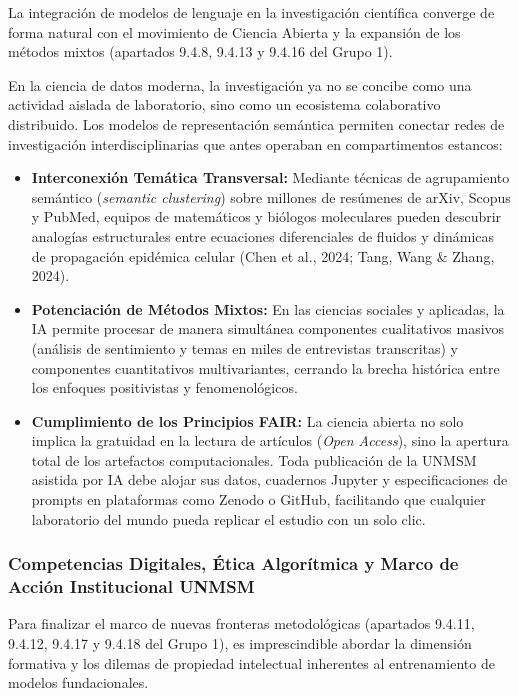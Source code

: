 La integración de modelos de lenguaje en la investigación científica converge de forma natural con el movimiento de Ciencia Abierta y la expansión de los métodos mixtos (apartados 9.4.8, 9.4.13 y 9.4.16 del Grupo 1).

En la ciencia de datos moderna, la investigación ya no se concibe como una actividad aislada de laboratorio, sino como un ecosistema colaborativo distribuido. Los modelos de representación semántica permiten conectar redes de investigación interdisciplinarias que antes operaban en compartimentos estancos:
\begin{itemize}
    \item \textbf{Interconexión Temática Transversal:} Mediante técnicas de agrupamiento semántico (\textit{semantic clustering}) sobre millones de resúmenes de arXiv, Scopus y PubMed, equipos de matemáticos y biólogos moleculares pueden descubrir analogías estructurales entre ecuaciones diferenciales de fluidos y dinámicas de propagación epidémica celular (Chen et al., 2024; Tang, Wang \& Zhang, 2024).
    \item \textbf{Potenciación de Métodos Mixtos:} En las ciencias sociales y aplicadas, la IA permite procesar de manera simultánea componentes cualitativos masivos (análisis de sentimiento y temas en miles de entrevistas transcritas) y componentes cuantitativos multivariantes, cerrando la brecha histórica entre los enfoques positivistas y fenomenológicos.
    \item \textbf{Cumplimiento de los Principios FAIR:} La ciencia abierta no solo implica la gratuidad en la lectura de artículos (\textit{Open Access}), sino la apertura total de los artefactos computacionales. Toda publicación de la UNMSM asistida por IA debe alojar sus datos, cuadernos Jupyter y especificaciones de prompts en plataformas como Zenodo o GitHub, facilitando que cualquier laboratorio del mundo pueda replicar el estudio con un solo clic.
\end{itemize}

\subsubsection{Competencias Digitales, Ética Algorítmica y Marco de Acción Institucional UNMSM}

Para finalizar el marco de nuevas fronteras metodológicas (apartados 9.4.11, 9.4.12, 9.4.17 y 9.4.18 del Grupo 1), es imprescindible abordar la dimensión formativa y los dilemas de propiedad intelectual inherentes al entrenamiento de modelos fundacionales.

